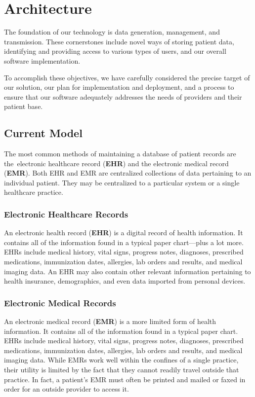 \documentclass[letterpaper]{article}
\begin{document}
\section{Architecture}
The foundation of our technology is data generation, management, and transmission. These cornerstones include novel ways of storing patient data, identifying and providing access to various types of users, and our overall software implementation.%

To accomplish these objectives, we have carefully considered the precise target of our solution, our plan for implementation and deployment, and a process to ensure that our software adequately addresses the needs of providers and their patient base.%

\subsection{Current Model}
The most common methods of maintaining a database of patient records are the electronic healthcare record (\textbf{EHR}) and the electronic medical record (\textbf{EMR}). Both EHR and EMR are centralized collections of data pertaining to an individual patient. They may be centralized to a particular system or a single healthcare practice.%

  \subsubsection{Electronic Healthcare Records}
  An electronic health record (\textbf{EHR}) is a digital record of health information. It contains all of the information found in a typical paper chart---plus a lot more. EHRs include medical history, vital signs, progress notes, diagnoses, prescribed medications, immunization dates, allergies, lab orders and results, and medical imaging data. An EHR may also contain other relevant information pertaining to health insurance, demographics, and even data imported from personal devices.%

  \subsubsection{Electronic Medical Records}
  An electronic medical record (\textbf{EMR}) is a more limited form of health information. It contains all of the information found in a typical paper chart. EHRs include medical history, vital signs, progress notes, diagnoses, prescribed medications, immunization dates, allergies, lab orders and results, and medical imaging data. While EMRs work well within the confines of a single practice, their utility is limited by the fact that they cannot readily travel outside that practice. In fact, a patient's EMR must often be printed and mailed or faxed in order for an outside provider to access it.%
\end{document}
